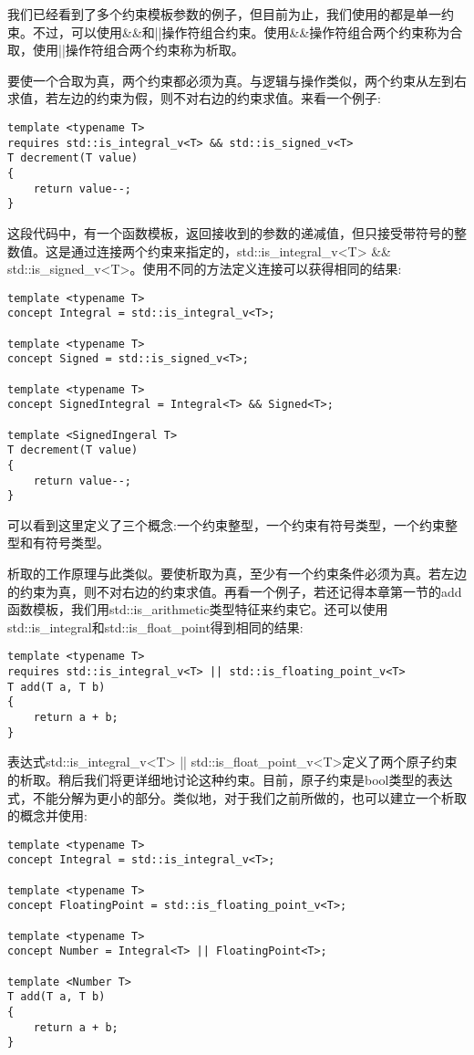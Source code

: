 
我们已经看到了多个约束模板参数的例子，但目前为止，我们使用的都是单一约束。不过，可以使用\&\&和||操作符组合约束。使用\&\&操作符组合两个约束称为合取，使用||操作符组合两个约束称为析取。

要使一个合取为真，两个约束都必须为真。与逻辑与操作类似，两个约束从左到右求值，若左边的约束为假，则不对右边的约束求值。来看一个例子:

\begin{lstlisting}[style=styleCXX]
template <typename T>
requires std::is_integral_v<T> && std::is_signed_v<T>
T decrement(T value)
{
	return value--;
}
\end{lstlisting}

这段代码中，有一个函数模板，返回接收到的参数的递减值，但只接受带符号的整数值。这是通过连接两个约束来指定的，std::is\_integral\_v<T> \&\& std::is\_signed\_v<T>。使用不同的方法定义连接可以获得相同的结果:

\begin{lstlisting}[style=styleCXX]
template <typename T>
concept Integral = std::is_integral_v<T>;

template <typename T>
concept Signed = std::is_signed_v<T>;

template <typename T>
concept SignedIntegral = Integral<T> && Signed<T>;

template <SignedIngeral T>
T decrement(T value)
{
	return value--;
}
\end{lstlisting}

可以看到这里定义了三个概念:一个约束整型，一个约束有符号类型，一个约束整型和有符号类型。

析取的工作原理与此类似。要使析取为真，至少有一个约束条件必须为真。若左边的约束为真，则不对右边的约束求值。再看一个例子，若还记得本章第一节的add函数模板，我们用std::is\_arithmetic类型特征来约束它。还可以使用std::is\_integral和std::is\_float\_point得到相同的结果:

\begin{lstlisting}[style=styleCXX]
template <typename T>
requires std::is_integral_v<T> || std::is_floating_point_v<T>
T add(T a, T b)
{
	return a + b;
}
\end{lstlisting}

表达式std::is\_integral\_v<T> || std::is\_float\_point\_v<T>定义了两个原子约束的析取。稍后我们将更详细地讨论这种约束。目前，原子约束是bool类型的表达式，不能分解为更小的部分。类似地，对于我们之前所做的，也可以建立一个析取的概念并使用:

\begin{lstlisting}[style=styleCXX]
template <typename T>
concept Integral = std::is_integral_v<T>;

template <typename T>
concept FloatingPoint = std::is_floating_point_v<T>;

template <typename T>
concept Number = Integral<T> || FloatingPoint<T>;

template <Number T>
T add(T a, T b)
{
	return a + b;
}
\end{lstlisting}

